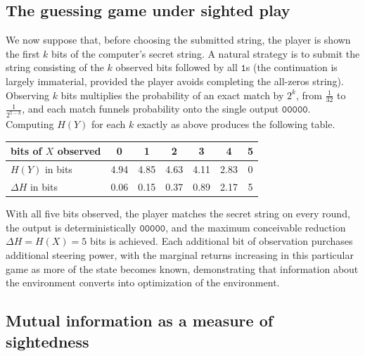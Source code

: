 \documentclass[11pt]{article}
\begin{document}
\subsection{The guessing game under sighted play}
\label{sec:gamesighted}

We now suppose that, before choosing the submitted string, the player is shown the first $k$ bits of the computer's secret string. A natural strategy is to submit the string consisting of the $k$ observed bits followed by all $\texttt{1}$s (the continuation is largely immaterial, provided the player avoids completing the all-zeros string). Observing $k$ bits multiplies the probability of an exact match by $2^k$, from $\frac1{32}$ to $\frac{1}{2^{5-k}}$, and each match funnels probability onto the single output $\texttt{00000}$. Computing $H(Y)$ for each $k$ exactly as above produces the following table.

\begin{center}
\begin{tabular}{lcccccc}
\toprule
bits of $X$ observed & 0 & 1 & 2 & 3 & 4 & 5 \\
\midrule
$H(Y)$ in bits & 4.94 & 4.85 & 4.63 & 4.11 & 2.83 & 0 \\
$\Delta H$ in bits & 0.06 & 0.15 & 0.37 & 0.89 & 2.17 & 5 \\
\bottomrule
\end{tabular}
\end{center}

With all five bits observed, the player matches the secret string on every round, the output is deterministically $\texttt{00000}$, and the maximum conceivable reduction $\Delta H = H(X) = 5$ bits is achieved. Each additional bit of observation purchases additional steering power, with the marginal returns increasing in this particular game as more of the state becomes known, demonstrating that information about the environment converts into optimization of the environment.

\subsection{Mutual information as a measure of sightedness}
\label{sec:misighted}
\end{document}
